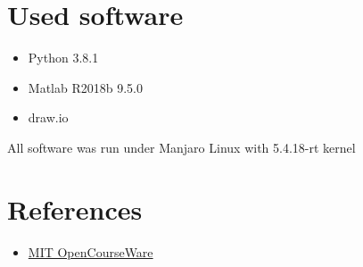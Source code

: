 \documentclass[a4paper,12pt]{article}
\begin{document}
\section{Used software}
\begin{itemize}
    \item Python 3.8.1
    \item Matlab R2018b 9.5.0
    \item draw.io
\end{itemize}
All software was run under Manjaro Linux with 5.4.18-rt kernel
\section{References}
\begin{itemize}
    \item \href{https://ocw.mit.edu/courses/aeronautics-and-astronautics/16-30-feedback-control-systems-fall-2010/lecture-notes/MIT16_30F10_lec14.pdf}
    {MIT OpenCourseWare}
\end{itemize}
\end{document}
